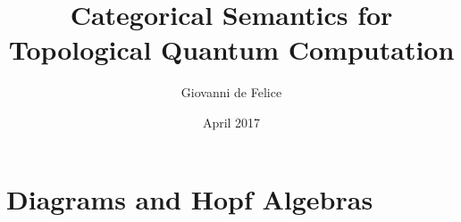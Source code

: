 \documentclass{article}
\title{Categorical Semantics for Topological Quantum Computation}
\author{Giovanni de Felice}
\date{April 2017}
\begin{document}

\section{Diagrams and Hopf Algebras}
\end{document}
